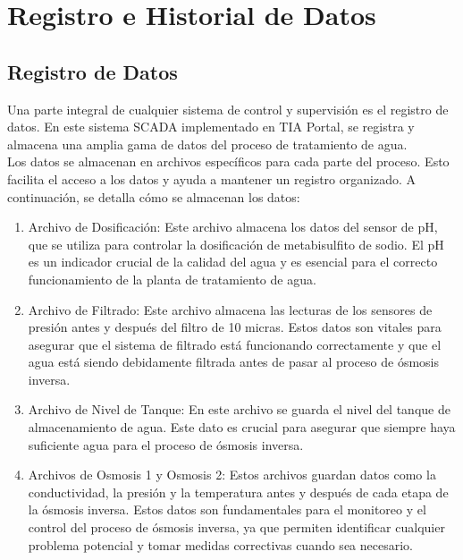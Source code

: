 \chapter{Registro e Historial de Datos}

\section{Registro de Datos}\label{sec:registro}

Una parte integral de cualquier sistema de control y supervisión es el registro de datos. En este sistema SCADA implementado en TIA Portal, se registra y almacena una amplia gama de datos del proceso de tratamiento de agua.\\

Los datos se almacenan en archivos específicos para cada parte del proceso. Esto facilita el acceso a los datos y ayuda a mantener un registro organizado. A continuación, se detalla cómo se almacenan los datos:\\


\begin{enumerate}
    \item Archivo de Dosificación: Este archivo almacena los datos del sensor de pH, que se utiliza para controlar la dosificación de metabisulfito de sodio. El pH es un indicador crucial de la calidad del agua y es esencial para el correcto funcionamiento de la planta de tratamiento de agua.
    \item 	Archivo de Filtrado: Este archivo almacena las lecturas de los sensores de presión antes y después del filtro de 10 micras. Estos datos son vitales para asegurar que el sistema de filtrado está funcionando correctamente y que el agua está siendo debidamente filtrada antes de pasar al proceso de ósmosis inversa.
    \item Archivo de Nivel de Tanque: En este archivo se guarda el nivel del tanque de almacenamiento de agua. Este dato es crucial para asegurar que siempre haya suficiente agua para el proceso de ósmosis inversa.
    \item Archivos de Osmosis 1 y Osmosis 2: Estos archivos guardan datos como la conductividad, la presión y la temperatura antes y después de cada etapa de la ósmosis inversa. Estos datos son fundamentales para el monitoreo y el control del proceso de ósmosis inversa, ya que permiten identificar cualquier problema potencial y tomar medidas correctivas cuando sea necesario.

\end{enumerate}


